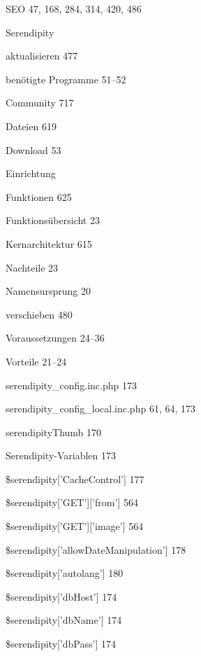 \documentclass{book}
\renewcommand\subitem{\par}
\begin{document}
\begin{multicols}{2}
\begin{osp-index}
  \item SEO\hspace{1mm} 47, 168, 284, 314, 420, 486
  \item Serendipity
    \subitem aktualisieren\hspace{1mm} 477
    \subitem ben\"otigte Programme\hspace{1mm} 51--52
    \subitem Community\hspace{1mm} 717
    \subitem Dateien\hspace{1mm} 619
    \subitem Download\hspace{1mm} 53
    \subitem Einrichtung\hspace{1mm} 
    \subitem Funktionen\hspace{1mm} 625
    \subitem Funktions\"ubersicht\hspace{1mm} 23
    \subitem Kernarchitektur\hspace{1mm} 615
    \subitem Nachteile\hspace{1mm} 23
    \subitem Namensursprung\hspace{1mm} 20
    \subitem verschieben\hspace{1mm} 480
    \subitem Voraussetzungen\hspace{1mm} 24--36
    \subitem Vorteile\hspace{1mm} 21--24
  \item serendipity\_config.inc.php\hspace{1mm} 173
  \item serendipity\_config\_local.inc.php\hspace{1mm} 61, 64, 173
  \item serendipityThumb\hspace{1mm} 170
  \item Serendipity-Variablen\hspace{1mm} 173
    \subitem \$serendipity['CacheControl']\hspace{1mm} 177
    \subitem \$serendipity['GET']['from']\hspace{1mm} 564
    \subitem \$serendipity['GET']['image']\hspace{1mm} 564
    \subitem \$serendipity['allowDateManipulation']\hspace{1mm} 178
    \subitem \$serendipity['autolang']\hspace{1mm} 180
    \subitem \$serendipity['dbHost']\hspace{1mm} 174
    \subitem \$serendipity['dbName']\hspace{1mm} 174
    \subitem \$serendipity['dbPass']\hspace{1mm} 174

\end{osp-index}
\end{multicols}
\end{document}
